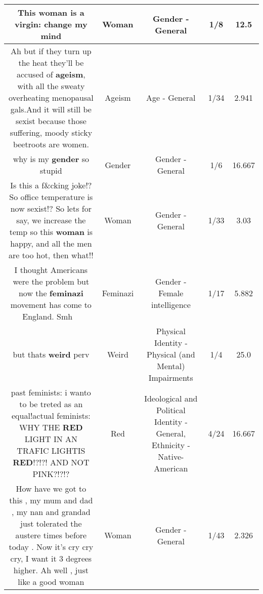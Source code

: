 \documentclass[11pt]{article}
\newlength\mylength
\begin{document}
\begin{center}
\begin{longtable}{|C{.65\mylength}|C{.30\mylength}|C{.12\mylength}|C{.12\mylength}|C{.12\mylength}|}
  \small This \textbf{woman} is a virgin: change my mind\normalsize   & Woman & Gender - General & 1/8 & 12.5 \\  \hline
  \small Ah but if they turn up the heat they'll be accused of \textbf{ageism}, with all the sweaty overheating menopausal gals.And it will still be sexist because those suffering, moody sticky beetroots are women.\normalsize   & Ageism & Age - General & 1/34 & 2.941 \\  \hline
  \small why is my \textbf{gender} so stupid\normalsize   & Gender & Gender - General & 1/6 & 16.667 \\  \hline
  \small Is this a f\&cking joke!? So office temperature is now sexist!? So lets for say, we increase the temp so this \textbf{woman} is happy, and all the men are too hot, then what!!\normalsize   & Woman & Gender - General & 1/33 & 3.03 \\  \hline
  \small I thought Americans were the problem but now the \textbf{feminazi} movement has come to England. Smh 🤦‍♂️\normalsize   & Feminazi & Gender - Female intelligence & 1/17 & 5.882 \\  \hline
  \small but thats \textbf{weird} perv\normalsize   & Weird & Physical Identity - Physical (and Mental) Impairments & 1/4 & 25.0 \\  \hline
  \small past feminists: i wanto to be treted as an equal!actual feminists: WHY THE \textbf{R\textbf{ED}} LIGHT IN AN TRAFIC LIGHTIS \textbf{R\textbf{ED}}!?!?! AND NOT PINK?!?!?\normalsize   & Red &  Ideological and Political Identity - General, Ethnicity - Native-American & 4/24 & 16.667 \\  \hline
  \small How have we got to this , my mum and dad , my nan and grandad just tolerated the austere times before today .  Now it's cry cry cry, I want it 3 degrees higher. Ah well , just like a good woman\normalsize   & Woman & Gender - General & 1/43 & 2.326 \\  \hline

\end{longtable}
\end{center}
\end{document}
